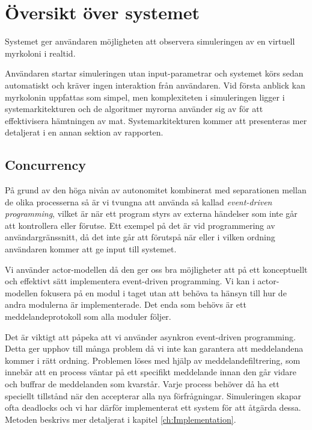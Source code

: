 


\chapter{Översikt över systemet}

\label{Systemet} 


Systemet ger användaren möjligheten att observera simuleringen av en virtuell myrkoloni i realtid.

Användaren startar simuleringen utan input-parametrar och systemet körs sedan automatiskt och kräver ingen interaktion från användaren. 
Vid första anblick kan myrkolonin uppfattas som simpel, men komplexiteten i simuleringen ligger i systemarkitekturen och de algoritmer myrorna använder sig av för att effektivisera hämtningen av mat. Systemarkitekturen kommer att presenteras mer detaljerat i en annan sektion av rapporten.

\section{Concurrency}

På grund av den höga nivån av autonomitet kombinerat med separationen mellan de olika processerna så är vi tvungna att använda så kallad \emph{event-driven programming}, vilket är när ett program styrs av externa händelser som inte går att kontrollera eller förutse. Ett exempel på det är vid programmering av användargränssnitt, då det inte går att förutspå när eller i vilken ordning användaren kommer att ge input till systemet. 

Vi använder actor-modellen då den ger oss bra möjligheter att på ett konceptuellt och effektivt sätt implementera event-driven programming. Vi kan i actor-modellen fokusera på en modul i taget utan att behöva ta hänsyn till hur de andra modulerna är implementerade. Det enda som behövs är ett meddelandeprotokoll som alla moduler följer.

Det är viktigt att påpeka att vi använder asynkron event-driven programming. Detta ger upphov till många problem då vi inte kan garantera att meddelandena kommer i rätt ordning. Problemen löses med hjälp av meddelandefiltrering, som innebär att en process väntar på ett specifikt meddelande innan den går vidare och buffrar de meddelanden som kvarstår. Varje process behöver då ha ett speciellt tillstånd när den accepterar alla nya förfrågningar.
Simuleringen skapar ofta deadlocks och vi har därför implementerat ett system för att åtgärda dessa. Metoden beskrivs mer detaljerat i kapitel \ref{ch:Implementation}.

